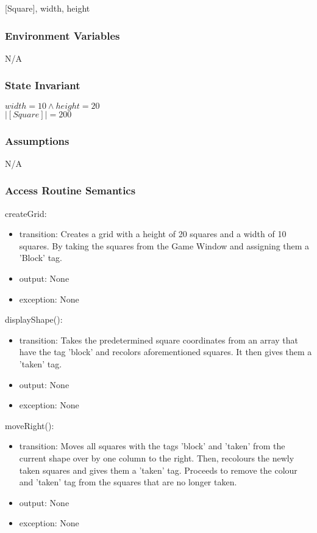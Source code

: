 \documentclass[12pt]{article}
\begin{document}
[Square], width, height

\subsubsection*{Environment Variables}

N/A

\subsubsection*{State Invariant}

$width = 10 \land height = 20$\\
$|[Square]| = 200$

\subsubsection*{Assumptions}

N/A

\subsubsection* {Access Routine Semantics}

\noindent createGrid:
\begin{itemize}
\item transition: Creates a grid with a height of 20 squares and a width of 10 squares. By taking the squares from the Game Window and assigning them a 'Block' tag.
\item output: None
\item exception: None
\end{itemize}

\noindent displayShape():
\begin{itemize}
\item transition: Takes the predetermined square coordinates from an array that have the tag 'block' and recolors aforementioned squares. It then gives them a 'taken' tag.  
\item output: None
\item exception: None
\end{itemize}

\noindent moveRight():
\begin{itemize}
\item transition: Moves all squares with the tags 'block' and 'taken' from the current shape over by one column to the right. Then, recolours the newly taken squares and gives them a 'taken' tag. Proceeds to remove the colour and 'taken' tag from the squares that are no longer taken.
\item output: None
\item exception: None
\end{itemize}
\end{document}
